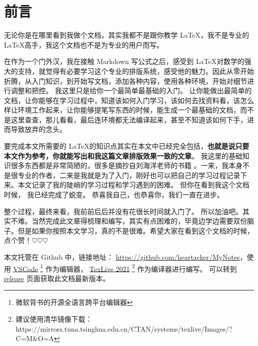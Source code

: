 \documentclass[UTF8,AutoFakeBold]{ctexart}
\numberwithin{figure}{section}
\numberwithin{table}{section}
\begin{document}
\tableofcontents

\listoffigures

\listoftables


\clearpage

\section*{前言}

无论你是在哪里看到我做个文档，其实我都不是跟你教学 \LaTeX ，我不是专业的 \LaTeX 高手，我这个文档也不是为专业的用户而写。

在作为一个门外汉，我在接触 Markdown 写公式之后，感受到 \LaTeX 对数学的强大的支持，就觉得有必要学习这个专业的排版系统，感受他的魅力。因此从零开始折腾，从入门知识，到开始写文档，添加各种内容，使用各种环境，开始对细节进行调整和把控。 我这里只是给你一个最简单最基础的入门。 让你能做出最简单的文档，让你能够在学习过程中，知道该如何入门学习，该如何去找资料看，该怎么样让环境工作起来，让你能够提笔写东西的时候，能生成一个最基础的文档，而不是这里查查，那儿看看，最后连环境都无法编译起来，甚至不知道该如何下手，进而导致放弃的念头。

要完成本文所需要的 \LaTeX 的知识点其实在本文中已经完全包括，\textbf{也就是说只要本文作为参考，你就能写出和我这篇文章排版效果一致的文章}。 我这里的基础知识很多东西都是非常简陋的，很多是摘抄自刘海洋老师的书籍 \cite{latex_start}。一来，我本身不是很专业的作者，二来是我就是为了入门，刚好也可以把自己的学习过程记录下来。本文记录了我的陡峭的学习过程和学习遇到的困难。 但你在看到我这个文档时候， 我已经完成了蜕变。 恭喜我自己，也恭喜你，我们一直在进步。

整个过程，最终来看，我前前后后并没有花很长时间就入门了。 所以加油吧。其实不难。当然完成此文章得梳理和编写，其实有点困难的，毕竟边学边需要双份脑子。但是如果你按照本文学习，真的不是很难。希望大家在看到这个文档的时候，点个赞！$\heartsuit$$\heartsuit$$\heartsuit$

本文托管在 Github 中，链接地址： \href{https://github.com/heartacker/MyNotes}{https://github.com/heartacker/MyNotes}，使用 \href{https://code.visualstudio.com/}{VSCode} \footnote{微软背书的开源全语言跨平台编辑器} 作为编辑器， \href{https://tug.org/texlive/}{TexLive 2021} \footnote{建议使用清华镜像下载： https://mirrors.tuna.tsinghua.edu.cn/CTAN/systems/texlive/Images/?C=M\&O=A} 作为编译器进行编写。 可以转到 \href{https://github.com/heartacker/MyNotes/releases}{release} 页面获取此文档最新版本。

\clearpage
\end{document}
